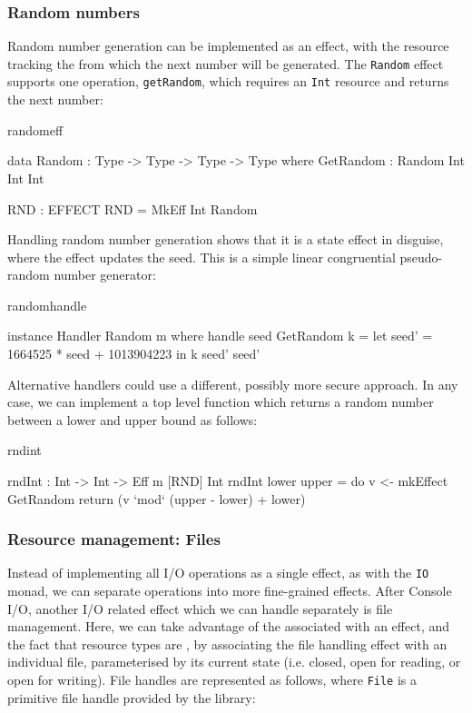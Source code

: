 \subsubsection{Random numbers}

Random number generation can be implemented as an effect, with the resource
tracking the  from which the next number will be generated.
The \texttt{Random} effect supports one operation, \texttt{getRandom}, which
requires an \texttt{Int} resource and returns the next number:

\begin{SaveVerbatim}{randomeff}

data Random : Type -> Type -> Type -> Type where
     GetRandom : Random Int Int Int

RND : EFFECT
RND = MkEff Int Random

\end{SaveVerbatim}

\noindent
Handling random number generation shows that it is a state effect in
disguise, where the effect updates the seed.
This is a simple linear congruential pseudo-random number generator:

\begin{SaveVerbatim}{randomhandle}

instance Handler Random m where
    handle seed GetRandom k
         = let seed' = 1664525 * seed + 1013904223 in
               k seed' seed'

\end{SaveVerbatim}

\noindent
Alternative handlers could use a different, possibly more secure approach.
In any case, we can implement a top level function which returns a random
number between a lower and upper bound as follows:

\begin{SaveVerbatim}{rndint}

rndInt : Int -> Int -> Eff m [RND] Int
rndInt lower upper 
    = do v <- mkEffect GetRandom 
         return (v `mod` (upper - lower) + lower)

\end{SaveVerbatim}

\subsubsection{Resource management: Files}

Instead of implementing all I/O operations as a single effect, as with the
\texttt{IO} monad, we can separate operations into more fine-grained effects.
After Console I/O, another I/O related effect which we can handle separately
is file management. Here, we can take advantage of the 
associated with an effect, and the fact that resource types are ,
by associating the file handling effect with an individual file, parameterised
by its current state (i.e. closed, open for reading, or open for writing).
File handles are represented as follows, where \texttt{File} is a primitive
file handle provided by the \Idris{} library:

